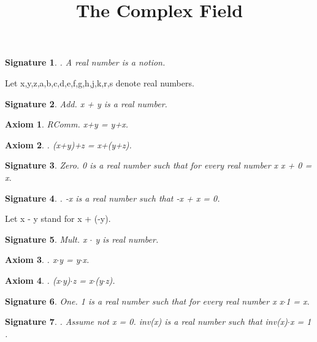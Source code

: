 \documentclass{article}
\newenvironment{forthel}{\begin{leftbar}}{\end{leftbar}}
\newtheorem{axiom}{Axiom}
\newtheorem{signature}{Signature}
\begin{document}
\title{The Complex Field}

\maketitle

\begin{forthel}
[set/-s] [element/-s] [number/-s]
\begin{signature}. A real number is a notion.

\end{signature}


Let x,y,z,a,b,c,d,e,f,g,h,j,k,r,s denote real numbers.



\begin{signature} Add. x + y is a real number.

\end{signature}
\begin{axiom} RComm. x+y = y+x.

\end{axiom}
\begin{axiom}. (x+y)+z = x+(y+z).

\end{axiom}
\begin{signature} Zero. 0 is a real number such that for every real number x x + 0 = x.

\end{signature}
\begin{signature}. -x is a real number such that -x + x = 0.

\end{signature}

Let x - y stand for x + (-y).

\begin{signature} Mult. x $\cdot$ y is real number.

\end{signature}
\begin{axiom}. x$\cdot$y = y$\cdot$x.

\end{axiom}
\begin{axiom}. (x$\cdot$y)$\cdot$z = x$\cdot$(y$\cdot$z).

\end{axiom}
\begin{signature} One. 1 is a real number such that for every real number x x$\cdot$1 = x.

\end{signature}
\begin{signature}. Assume not x = 0. inv(x) is a real number such that inv(x)$\cdot$x = 1 .


\end{signature}
\end{forthel}
\end{document}
